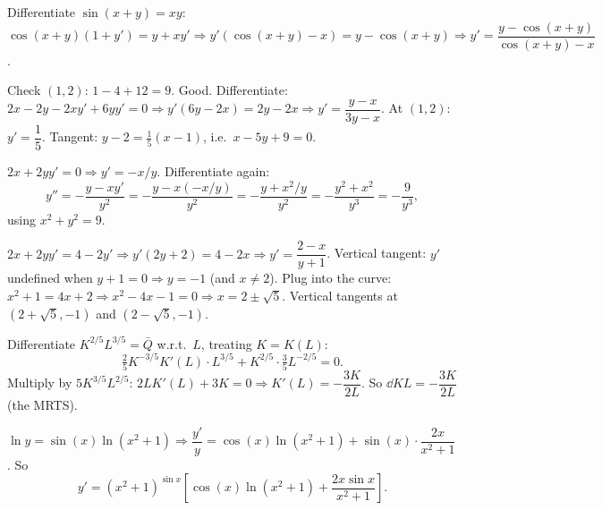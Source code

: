 \begin{solutions}
  \item Differentiate $\sin(x+y)=xy$: $\cos(x+y)(1+y')=y+xy'
        \Rightarrow y'(\cos(x+y)-x)=y-\cos(x+y)\Rightarrow
        y'=\dfrac{y-\cos(x+y)}{\cos(x+y)-x}$.

  \item Check $(1,2)$: $1-4+12=9$. Good. Differentiate:
        $2x-2y-2xy'+6yy'=0\Rightarrow y'(6y-2x)=2y-2x\Rightarrow
        y'=\dfrac{y-x}{3y-x}$. At $(1,2)$: $y'=\dfrac{1}{5}$. Tangent:
        $y-2=\tfrac15(x-1)$, i.e.\ $x-5y+9=0$.

  \item $2x+2yy'=0\Rightarrow y'=-x/y$. Differentiate again:
        \[
          y''=-\frac{y-xy'}{y^{2}}=-\frac{y-x(-x/y)}{y^{2}}
             =-\frac{y+x^{2}/y}{y^{2}}
             =-\frac{y^{2}+x^{2}}{y^{3}}=-\frac{9}{y^{3}},
        \]
        using $x^{2}+y^{2}=9$.

  \item $2x+2yy'=4-2y'\Rightarrow y'(2y+2)=4-2x\Rightarrow
        y'=\dfrac{2-x}{y+1}$. Vertical tangent: $y'$ undefined when
        $y+1=0\Rightarrow y=-1$ (and $x\neq 2$). Plug into the curve:
        $x^{2}+1=4x+2\Rightarrow x^{2}-4x-1=0\Rightarrow
        x=2\pm\sqrt{5}$. Vertical tangents at $(2+\sqrt{5},-1)$ and
        $(2-\sqrt{5},-1)$.

  \item Differentiate $K^{2/5}L^{3/5}=\bar Q$ w.r.t.\ $L$, treating
        $K=K(L)$:
        \[
          \tfrac25K^{-3/5}K'(L)\cdot L^{3/5}+K^{2/5}\cdot\tfrac35L^{-2/5}=0 .
        \]
        Multiply by $5K^{3/5}L^{2/5}$: $2LK'(L)+3K=0\Rightarrow
        K'(L)=-\dfrac{3K}{2L}$. So $\dd{K}{L}=-\dfrac{3K}{2L}$ (the
        MRTS).

  \item $\ln y=\sin(x)\ln(x^{2}+1)\Rightarrow\dfrac{y'}{y}
        =\cos(x)\ln(x^{2}+1)+\sin(x)\cdot\dfrac{2x}{x^{2}+1}$. So
        \[
          y'=(x^{2}+1)^{\sin x}\left[\cos(x)\ln(x^{2}+1)
             +\frac{2x\sin x}{x^{2}+1}\right] .
        \]


\end{solutions}
